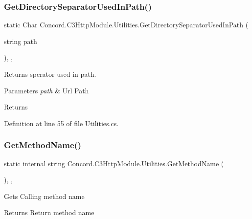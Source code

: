 \subsubsection{\texorpdfstring{GetDirectorySeparatorUsedInPath()}{GetDirectorySeparatorUsedInPath()}}
{\footnotesize\ttfamily static Char Concord.\+C3\+Http\+Module.\+Utilities.\+Get\+Directory\+Separator\+Used\+In\+Path (\begin{DoxyParamCaption}\item[{string}]{path }\end{DoxyParamCaption})\hspace{0.3cm}{\ttfamily [inline]}, {\ttfamily [static]}, {\ttfamily [private]}}



Returns sperator used in path. 


\begin{DoxyParams}{Parameters}
{\em path} & Url Path\\
\hline
\end{DoxyParams}
\begin{DoxyReturn}{Returns}

\end{DoxyReturn}


Definition at line 55 of file Utilities.\+cs.

\mbox{\label{class_concord_1_1_c3_http_module_1_1_utilities_a28cf8fb31878e9955f8f2f9489e1c4a5}} 
\subsubsection{\texorpdfstring{GetMethodName()}{GetMethodName()}}
{\footnotesize\ttfamily static internal string Concord.\+C3\+Http\+Module.\+Utilities.\+Get\+Method\+Name (\begin{DoxyParamCaption}{ }\end{DoxyParamCaption})\hspace{0.3cm}{\ttfamily [inline]}, {\ttfamily [static]}, {\ttfamily [private]}}



Gets Calling method name 

\begin{DoxyReturn}{Returns}
Return method name
\end{DoxyReturn}


